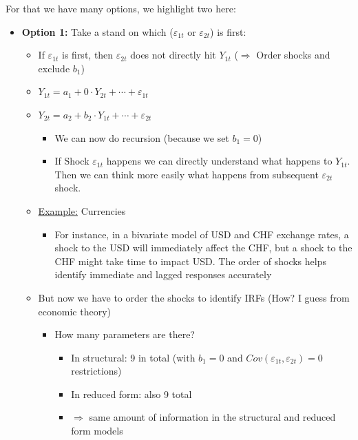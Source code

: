 For that we have many options, we highlight two here:
\begin{itemize}
    \item \textbf{Option 1:} Take a stand on which ($\varepsilon_{1t}$ or $\varepsilon_{2t}$) is first:
    \begin{itemize}
        \item If $\varepsilon_{1t}$ is first, then $\varepsilon_{2t}$ does not directly hit $Y_{1t}$ ($\Rightarrow$ Order shocks and exclude $b_1$)
        \item[] $Y_{1t} = a_1 + 0\cdot Y_{2t} + \cdots + \varepsilon_{1t}$
        \item[] $Y_{2t} = a_2 + b_2 \cdot Y_{1t} + \cdots + \varepsilon_{2t}$
        \begin{itemize}
            \item We can now do recursion (because we set $b_1=0$)
            \item If Shock $\varepsilon_{1t}$ happens we can directly understand what happens to $Y_{1t}$. Then we can think more easily what happens from subsequent $\varepsilon_{2t}$ shock.
        \end{itemize}
        \item \underline{Example:} Currencies
        \begin{itemize}
            \item For instance, in a bivariate model of USD and CHF exchange rates, a shock to the USD will immediately affect the CHF, but a shock to the CHF might take time to impact USD. The order of shocks helps identify immediate and lagged responses accurately 
        \end{itemize}
        \item But now we have to order the shocks to identify IRFs (How? I guess from economic theory)
        \begin{itemize}
            \item How many parameters are there?
            \begin{itemize}
                \item In structural: 9 in total (with $b_1 = 0$ and $Cov(\varepsilon_{1t},\varepsilon_{2t})=0$ restrictions)
                \item In reduced form: also 9 total
                \item $\Rightarrow$ same amount of information in the structural and reduced form models
            \end{itemize}
        \end{itemize}

\end{itemize}
\end{itemize}
